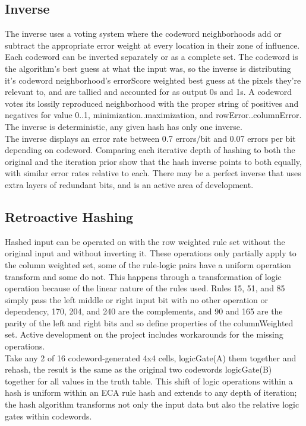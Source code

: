 \documentclass[11pt]{article}
\begin{document}
\subsection{Inverse}

The inverse uses a voting system where the codeword neighborhoods add or subtract the appropriate error weight at every location in their zone of influence. Each codeword can be inverted separately or as a complete set. The codeword is the algorithm's best guess at what the input was, so the inverse is distributing it's codeword neighborhood's errorScore weighted best guess at the pixels they're relevant to, and are tallied and accounted for as output 0s and 1s. A codeword votes its lossily reproduced neighborhood with the proper string of positives and negatives  for value 0..1, minimization..maximization, and rowError..columnError. The inverse is deterministic, any given hash has only one inverse.\\

The inverse displays an error rate between 0.7 errors/bit and 0.07 errors per bit depending on codeword. Comparing each iterative depth of hashing to both the original and the iteration prior show that the hash inverse points to both equally, with similar error rates relative to each. There may be a perfect inverse that uses extra layers of redundant bits, and is an active area of development. \\



\subsection{Retroactive Hashing}
Hashed input can be operated on with the row weighted rule set without the original input and without inverting it. These operations only partially apply to the column weighted set, some of the rule-logic pairs have a uniform operation transform and some do not. This happens through a transformation of logic operation because of the linear nature of the rules used. Rules 15, 51, and 85 simply pass the left middle or right input bit with no other operation or dependency, 170, 204, and 240 are the complements, and 90 and 165 are the parity of the left and right bits and so define properties of the columnWeighted set. Active development on the project includes workarounds for the missing operations.\\

Take any 2 of 16 codeword-generated 4x4 cells, logicGate(A) them together and rehash, the result is the same as the original two codewords logicGate(B) together for all values in the truth table. This shift of logic operations within a hash is uniform within an ECA rule hash and extends to any depth of iteration; the hash algorithm transforms not only the input data but also the relative logic gates within codewords. \\
\end{document}
